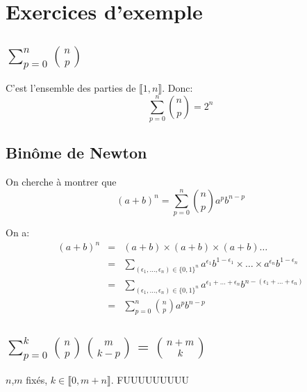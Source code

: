 \section{Exercices d'exemple}
  \subsection{$\sum_{p=0}^n \binom{n}{p}$}
    C'est l'ensemble des parties de $\llbracket 1,n\rrbracket$. Donc:
    \[
      \sum_{p=0}^n \binom{n}{p} = 2^n
    \]

  \subsection{Binôme de Newton}
  On cherche à montrer que \[
    (a+b)^n = \sum_{p=0}^n \binom{n}{p}a^pb^{n-p}
  \]

  On a:
  \begin{eqnarray*}
    (a+b)^n &=& (a+b)\times(a+b)\times(a+b)\dots\\
            &=& \sum_{(\epsilon_1,\dots,\epsilon_n)\in\{0,1\}^n} a^{\epsilon_1} b^{1-\epsilon_1}\times\dots\times a^{\epsilon_n} b^{1-\epsilon_n}\\
            &=& \sum_{(\epsilon_1,\dots,\epsilon_n)\in\{0,1\}^n} a^{\epsilon_1+\dots+\epsilon_n} b^{n-(\epsilon_1+\dots+\epsilon_n)}\\
            &=& \sum_{p=0}^n \binom{n}{p} a^p b^{n-p}
  \end{eqnarray*}


  \subsection{$\sum_{p=0}^k\binom{n}{p}\binom{m}{k-p} = \binom{n+m}{k}$}
    $n$,$m$ fixés, $k\in\llbracket 0, m+n\rrbracket$.
    FUUUUUUUUU
